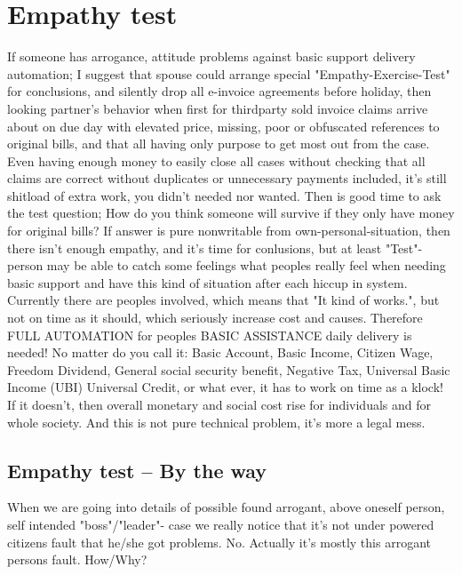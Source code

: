 \section{Empathy test}
\label{Empathy_test}
If someone has arrogance\allowbreak\cite{OwnFault}, attitude problems against
basic support delivery automation; I suggest that spouse could arrange special
"Empathy-Exercise-Test" for conclusions, and silently drop all e-invoice
agreements before holiday, then looking partner's behavior when first for
thirdparty sold invoice claims arrive about on due day with elevated price,
missing, poor or obfuscated references to original bills, and that all having
only purpose to get most out from the case. Even having enough money to easily
close all cases without checking that all claims are correct without
duplicates or unnecessary payments included, it's still shitload of extra
work, you didn't needed nor wanted. Then is good time to ask the test
question; How do you think someone will survive if they only have money for
original bills? If answer is pure nonwritable from
own-personal-situation\allowbreak\cite{ItsekkyydenAika}, then there isn't
enough empathy, and it's time for conlusions, but at least "Test"-person may
be able to catch some feelings what peoples really feel when needing basic
support\allowbreak\cite{HS202412141445} and have this kind of situation after
each hiccup in system\allowbreak\cite{KelaSystemUpdates}\allowbreak\cite{
 Tukimuutokset_2025}\allowbreak\cite{KVV_2025_4}. Currently there are peoples
involved, which means that "It kind of works."\allowbreak\cite{
 KelaProcessUpdates}, but not on time\allowbreak\cite{KELAProcessingTime} as
it should, which seriously increase cost and causes. Therefore FULL AUTOMATION
for peoples BASIC ASSISTANCE daily delivery is needed! No matter do you call
it: Basic Account\allowbreak\cite{LiberaPerustili}, Basic Income, Citizen
Wage, Freedom Dividend, General social security benefit\allowbreak\cite{GSSB},
Negative Tax\allowbreak\cite{BasicIncomeInit}, Universal Basic Income
(UBI)\allowbreak\cite{UniversalBasicIncome} Universal Credit\allowbreak\cite{
 UniversalCredit}, or what ever, it has to work on time as a klock! If it
doesn't, then overall monetary and social cost rise for individuals and for
whole society. And this is not pure technical problem\allowbreak\cite{
 Kelapotti}, it's more a legal mess.

\subsection{Empathy test -- By the way}
\label{Empathy_test_by_the_way}
When we are going into details of possible found arrogant, above oneself
person, self intended "boss"/"leader"- case we really notice that it's not
under powered citizens fault that he/she got problems. No. Actually it's
mostly this arrogant persons fault\allowbreak\cite{OwnFault}. How/Why?

